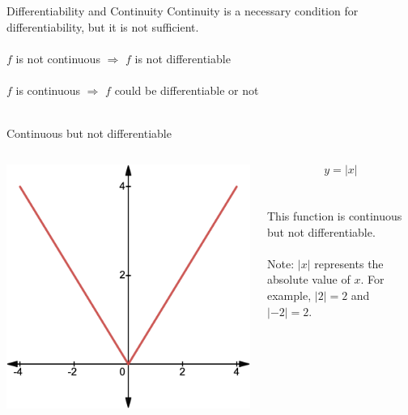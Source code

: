 \documentclass{./../../Latex/teaching_slides}
\begin{document}
\begin{frame}{Differentiability and Continuity}
Continuity is a necessary condition for differentiability, but it is not sufficient. \\~\\

$f$ is not continuous $\Longrightarrow$ $f$ is not differentiable \\~\\

$f$ is continuous $\Longrightarrow$ $f$ could be differentiable or not \\~\\

\end{frame}

\begin{frame}{Continuous but not differentiable}
\vspace{1em}
\centering
\begin{columns}[c]
\begin{column}{0.6\textwidth}
\includegraphics[scale=0.225]{cont_not_diff.png}
\end{column}
\begin{column}{0.4\textwidth}
$$ y = |x| $$\\~\\
This function is continuous but not differentiable. \\~\\
Note: $|x|$ represents the absolute value of $x$. For example, $|2| =2$ and $|-2|=2$.
\end{column} 
\end{columns}
\end{frame}
\end{document}
